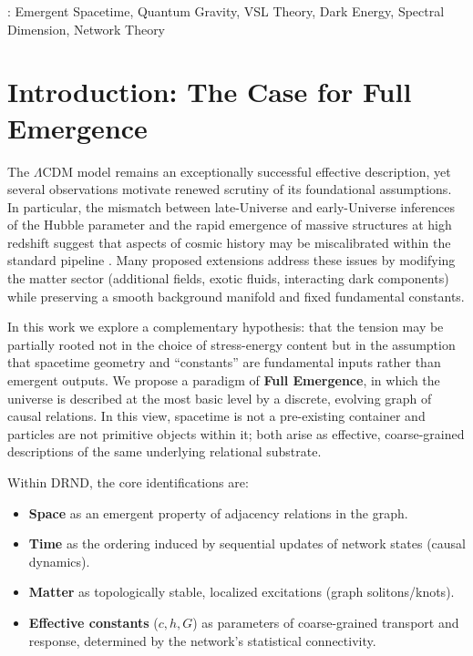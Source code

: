 \documentclass[12pt]{iopart}
\begin{document}
\vspace{2pc}
: Emergent Spacetime, Quantum Gravity, VSL Theory, Dark Energy, Spectral Dimension, Network Theory

\maketitle


\section{Introduction: The Case for Full Emergence}

The $\Lambda$CDM model remains an exceptionally successful effective description, yet several observations motivate renewed scrutiny of its foundational assumptions. In particular, the mismatch between late-Universe and early-Universe inferences of the Hubble parameter and the rapid emergence of massive structures at high redshift suggest that aspects of cosmic history may be miscalibrated within the standard pipeline \cite{Riess2022,Labbe2023}. Many proposed extensions address these issues by modifying the matter sector (additional fields, exotic fluids, interacting dark components) while preserving a smooth background manifold and fixed fundamental constants.

In this work we explore a complementary hypothesis: that the tension may be partially rooted not in the choice of stress-energy content but in the assumption that spacetime geometry and ``constants'' are fundamental inputs rather than emergent outputs. We propose a paradigm of \textbf{Full Emergence}, in which the universe is described at the most basic level by a discrete, evolving graph of causal relations. In this view, spacetime is not a pre-existing container and particles are not primitive objects within it; both arise as effective, coarse-grained descriptions of the same underlying relational substrate.

Within DRND, the core identifications are:
\begin{itemize}
    \item \textbf{Space} as an emergent property of adjacency relations in the graph.
    \item \textbf{Time} as the ordering induced by sequential updates of network states (causal dynamics).
    \item \textbf{Matter} as topologically stable, localized excitations (graph solitons/knots).
    \item \textbf{Effective constants} ($c, h, G$) as parameters of coarse-grained transport and response, determined by the network's statistical connectivity.
\end{itemize}
\end{document}
